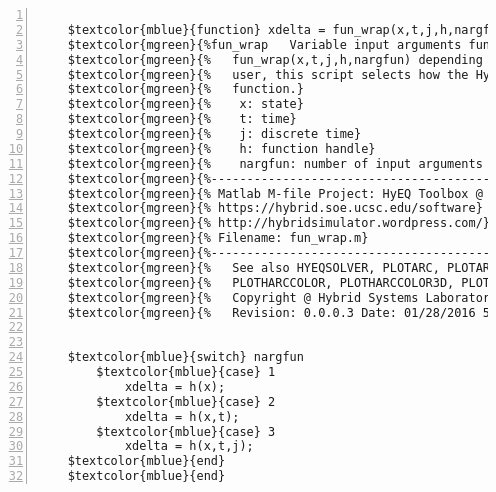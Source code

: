%  
%  
%  
%  
  
  
\DefineShortVerb[fontfamily=courier,fontseries=m]{\$} 
\DefineShortVerb[fontfamily=courier,fontseries=b]{\#} 
  
\begin{Verbatim}[commandchars=\$\{\},numbers=left,numbersep=2pt] 

    $textcolor{mblue}{function} xdelta = fun_wrap(x,t,j,h,nargfun) 
    $textcolor{mgreen}{%fun_wrap   Variable input arguments function (easy use for users).} 
    $textcolor{mgreen}{%   fun_wrap(x,t,j,h,nargfun) depending on the function h written by the} 
    $textcolor{mgreen}{%   user, this script selects how the HyEQ solver should call that} 
    $textcolor{mgreen}{%   function.} 
    $textcolor{mgreen}{%    x: state} 
    $textcolor{mgreen}{%    t: time} 
    $textcolor{mgreen}{%    j: discrete time} 
    $textcolor{mgreen}{%    h: function handle} 
    $textcolor{mgreen}{%    nargfun: number of input arguments of function h    } 
    $textcolor{mgreen}{%--------------------------------------------------------------------------} 
    $textcolor{mgreen}{% Matlab M-file Project: HyEQ Toolbox @  Hybrid Systems Laboratory (HSL), } 
    $textcolor{mgreen}{% https://hybrid.soe.ucsc.edu/software} 
    $textcolor{mgreen}{% http://hybridsimulator.wordpress.com/} 
    $textcolor{mgreen}{% Filename: fun_wrap.m} 
    $textcolor{mgreen}{%--------------------------------------------------------------------------} 
    $textcolor{mgreen}{%   See also HYEQSOLVER, PLOTARC, PLOTARC3, PLOTFLOWS, PLOTHARC,} 
    $textcolor{mgreen}{%   PLOTHARCCOLOR, PLOTHARCCOLOR3D, PLOTHYBRIDARC, PLOTJUMPS.} 
    $textcolor{mgreen}{%   Copyright @ Hybrid Systems Laboratory (HSL),} 
    $textcolor{mgreen}{%   Revision: 0.0.0.3 Date: 01/28/2016 5:12:00} 
     
     
    $textcolor{mblue}{switch} nargfun 
        $textcolor{mblue}{case} 1 
            xdelta = h(x); 
        $textcolor{mblue}{case} 2 
            xdelta = h(x,t); 
        $textcolor{mblue}{case} 3 
            xdelta = h(x,t,j);         
    $textcolor{mblue}{end} 
    $textcolor{mblue}{end}  
\end{Verbatim}  
  
\UndefineShortVerb{\$} 
\UndefineShortVerb{\#} 
 